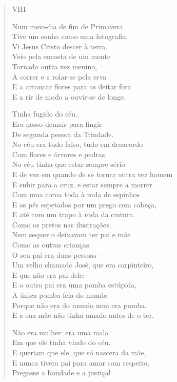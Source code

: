 \begin{verse}
VIII

Num meio-dia de fim de Primavera \\
Tive um sonho como uma fotografia. \\
Vi Jesus Cristo descer à terra. \\
Veio pela encosta de um monte \\
Tornado outra vez menino, \\
A correr e a rolar-se pela erva \\
E a arrancar flores para as deitar fora \\
E a rir de modo a ouvir-se de longe.

Tinha fugido do céu. \\
Era nosso demais para fingir \\
De segunda pessoa da Trindade. \\
No céu era tudo falso, tudo em desacordo \\
Com flores e árvores e pedras. \\
No céu tinha que estar sempre sério \\
E de vez em quando de se tornar outra vez homem \\
E subir para a cruz, e estar sempre a morrer \\
Com uma coroa toda à roda de espinhos \\
E os pés espetados por um prego com cabeça, \\
E até com um trapo à roda da cintura \\
Como os pretos nas ilustrações. \\
Nem sequer o deixavam ter pai e mãe \\
Como as outras crianças. \\
O seu pai era duas pessoas — \\
Um velho chamado José, que era carpinteiro, \\
E que não era pai dele; \\
E o outro pai era uma pomba estúpida, \\
A única pomba feia do mundo \\
Porque não era do mundo nem era pomba. \\
E a sua mãe não tinha amado antes de o ter.

Não era mulher: era uma mala \\
Em que ele tinha vindo do céu. \\
E queriam que ele, que só nascera da mãe, \\
E nunca tivera pai para amar com respeito, \\
Pregasse a bondade e a justiça!


\end{verse}
